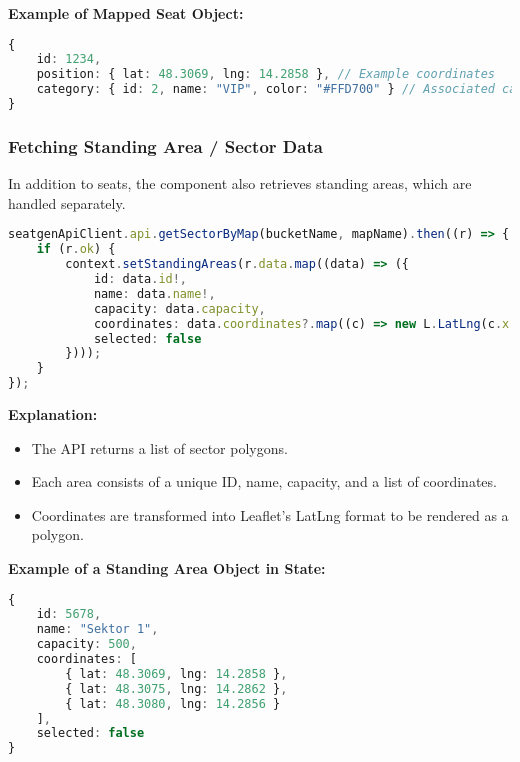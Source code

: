 \textbf{Example of Mapped Seat Object:}
\begin{lstlisting}[language=TypeScript, caption=Seat Object in State, label=lst:seat-object]
{
    id: 1234,
    position: { lat: 48.3069, lng: 14.2858 }, // Example coordinates
    category: { id: 2, name: "VIP", color: "#FFD700" } // Associated category
}
\end{lstlisting}

\subsubsection{Fetching Standing Area / Sector Data}
In addition to seats, the component also retrieves standing areas, which are handled separately.

\begin{lstlisting}[language=TypeScript, caption=Fetching Standing Areas, label=lst:fetch-standingareas]
seatgenApiClient.api.getSectorByMap(bucketName, mapName).then((r) => {
    if (r.ok) {
        context.setStandingAreas(r.data.map((data) => ({
            id: data.id!,
            name: data.name!,
            capacity: data.capacity,
            coordinates: data.coordinates?.map((c) => new L.LatLng(c.x!, c.y!)) ?? [],
            selected: false
        })));
    }
});
\end{lstlisting}

\textbf{Explanation:}
\begin{itemize}
    \item The API returns a list of sector polygons.
    \item Each area consists of a unique ID, name, capacity, and a list of coordinates.
    \item Coordinates are transformed into Leaflet’s LatLng format to be rendered as a polygon.
\end{itemize}

\textbf{Example of a Standing Area Object in State:}
\begin{lstlisting}[language=TypeScript, caption=Standing Area Object in State, label=lst:standingarea-object]
{
    id: 5678,
    name: "Sektor 1",
    capacity: 500,
    coordinates: [
        { lat: 48.3069, lng: 14.2858 },
        { lat: 48.3075, lng: 14.2862 },
        { lat: 48.3080, lng: 14.2856 }
    ],
    selected: false
}
\end{lstlisting}

